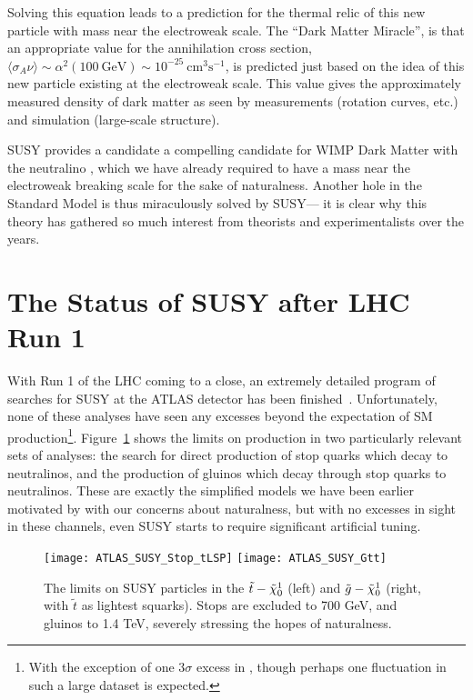 Solving this equation leads to a prediction for the thermal relic of this new particle with mass near the electroweak scale. The ``Dark Matter Miracle'', is that an appropriate value for the annihilation cross section, $\langle \sigma_A \nu \rangle \sim \alpha^2 (100~\mathrm{GeV})\sim 10^{-25}~\mathrm{cm}^3\mathrm{s}^{-1}$, is predicted just based on the idea of this new particle existing at the electroweak scale. This value gives the approximately measured density of dark matter as seen by measurements (rotation curves, etc.) and simulation (large-scale structure). 

SUSY provides a candidate a compelling candidate for WIMP Dark Matter with the neutralino \lsp, which we have already required to have a mass near the electroweak breaking scale for the sake of naturalness. Another hole in the Standard Model is thus miraculously solved by SUSY--- it is clear why this theory has gathered so much interest from theorists and experimentalists over the years.

\section{The Status of SUSY after LHC Run 1}
\label{chapter:susy:status}

With Run 1 of the LHC coming to a close, an extremely detailed program  of searches for SUSY at the ATLAS detector has been finished~\cite{Atlassusy1lepton,susyoleptons,Aad:2011ks,SUSYZeroLep2011,SUSYOnelep2011,SUSYJetMult2011,SUSYTwoLep2011,SUSYStopGluino2010,Aad:2013wta,Aad:2014lra}. Unfortunately, none of these analyses have seen any excesses beyond the expectation of SM production\footnote{With the exception of one $3\sigma$ excess in \cite{Aad:2015wqa}, though perhaps one fluctuation in such a large dataset is expected.}. Figure~\ref{fig:susy:limits} shows the limits on production in two particularly relevant sets of analyses: the search for direct production of stop quarks which decay to neutralinos, and the production of gluinos which decay through stop quarks to neutralinos. These are exactly the simplified models we have been earlier motivated by with our concerns about naturalness, but with no excesses in sight in these channels, even SUSY starts to require significant artificial tuning.



\begin{figure}[htbp]
  \centering
    \texttt{[image: ATLAS\_SUSY\_Stop\_tLSP]}
    \texttt{[image: ATLAS\_SUSY\_Gtt]}
  \caption{The limits on SUSY particles in the $\tilde{t}-\tilde{\chi}_0^1$ (left) and $\tilde{g}-\tilde{\chi}_0^1$ (right, with $\tilde{t}$ as lightest squarks). Stops are excluded to 700 GeV, and gluinos to 1.4 TeV, severely stressing the hopes of naturalness.}
  \label{fig:susy:limits}
\end{figure}


